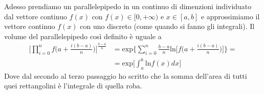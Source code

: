 \documentclass[11pt,a4paper]{report}
\theoremstyle{definition}
\theoremstyle{plain}
\theoremstyle{plain}
\begin{document}
			Adesso prendiamo un parallelepipedo in un continuo di dimenzioni individuato dal vettore continuo $f(x)$ con $f(x)\in[0,+\infty)$ e $x\in[a,b]$ e approssimiamo il vettore continuo $f(x)$ con uno discreto (come quando si fanno gli integrali).\newline
			Il volume del parallelepipedo così definito è uguale a
			\begin{equation}
			\begin{split}
				\Bigg[\prod_{i=0}^n f\bigg(a+\frac{i(b-a)}{n}\bigg)\Bigg]^{\frac{b-a}{n}}&=
				\textrm{exp}\Bigg\{\sum_{i=0}^n\frac{b-a}{n}\textrm{ln}\bigg[f\bigg(a+\frac{i(b-a)}{n}\bigg)\bigg]\Bigg\}=\\
				&=\textrm{exp}\bigg[\int_a^b \textrm{ln}f(x)dx\bigg]
			\end{split}
			\end{equation}
			Dove dal secondo al terzo passaggio ho scritto che la somma dell'area di tutti quei rettangolini è l'integrale di quella roba.\newline
\end{document}
